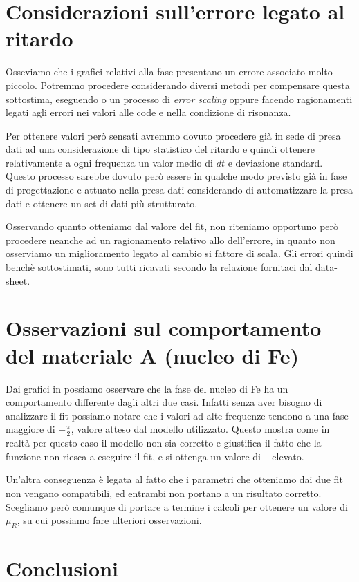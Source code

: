 \documentclass[
    rmp,
    floatfix,
    reprint, 
    superscriptaddress, 
    altaffilletter, 
    amsmath, 
    amssymb, 
    a4paper]{revtex4-2}
\begin{document}
\section*{Considerazioni sull'errore legato al ritardo}
Osseviamo che i grafici relativi alla fase presentano un errore associato molto piccolo. Potremmo procedere considerando diversi metodi per compensare questa sottostima, eseguendo o un processo di \textit{error scaling} oppure facendo ragionamenti legati agli errori nei valori alle code e nella condizione di risonanza. 

Per ottenere valori però sensati avremmo dovuto procedere già in sede di presa dati ad una considerazione di tipo statistico del ritardo e quindi ottenere relativamente a ogni frequenza un valor medio di $dt$ e deviazione standard. Questo processo sarebbe dovuto però essere in qualche modo previsto già in fase di progettazione e attuato nella presa dati considerando di automatizzare la presa dati e ottenere un set di dati più strutturato. 

Osservando quanto otteniamo dal valore del fit, non riteniamo opportuno però procedere neanche ad un ragionamento relativo allo  dell'errore, in quanto non osserviamo un miglioramento legato al cambio si fattore di scala. Gli errori quindi benchè sottostimati, sono tutti ricavati secondo la relazione fornitaci dal data-sheet.


\section*{Osservazioni sul comportamento del materiale A (nucleo di F\lowercase{e})}
Dai grafici in  possiamo osservare che la fase del nucleo di Fe ha un comportamento differente dagli altri due casi. Infatti senza aver bisogno di analizzare il fit possiamo notare che i valori ad alte frequenze tendono a una fase maggiore di $-\frac{\pi}{2}$, valore atteso dal modello utilizzato. Questo mostra come in realtà per questo caso il modello non sia corretto e giustifica il fatto che la funzione non riesca a eseguire il fit, e si ottenga un valore di \ChiNdf~ elevato. 

Un'altra conseguenza è legata al fatto che i parametri che otteniamo dai due fit non vengano compatibili, ed entrambi non portano a un risultato corretto. Scegliamo però comunque di portare a termine i calcoli per ottenere un valore di $\mu_R$, su cui possiamo fare ulteriori osservazioni. 


\section*{Conclusioni}
\end{document}
